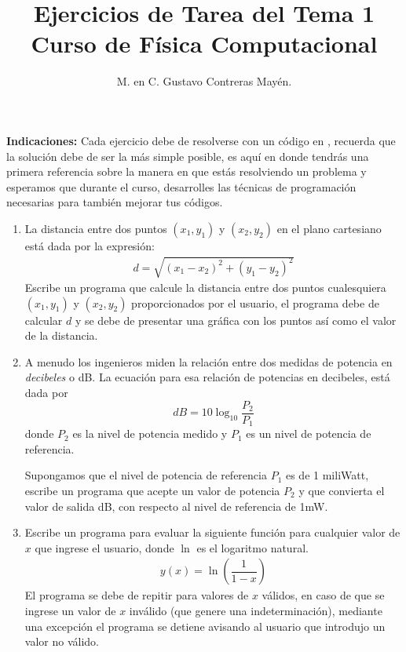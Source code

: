 
\author{M. en C. Gustavo Contreras Mayén.}
\title{Ejercicios de Tarea del Tema 1 \\ Curso de Física Computacional}
\date{ }

\maketitle
\fontsize{14}{14}\selectfont
\textbf{Indicaciones: } Cada ejercicio debe de resolverse con un código en \python, recuerda que la solución debe de ser la más simple posible, es aquí en donde tendrás una primera referencia sobre la manera en que estás resolviendo un problema y esperamos que durante el curso, desarrolles las técnicas de programación necesarias para también mejorar tus códigos.
\begin{enumerate}
\item La distancia entre dos puntos $(x_{1},y_{1})$ y $(x_{2},y_{2})$ en el plano cartesiano está dada por la expresión:
\begin{align*}
d = \sqrt{(x_{1} - x_{2})^{2} + (y_{1} - y_{2})^{2}}
\end{align*}
Escribe un programa que calcule la distancia entre dos puntos cualesquiera $(x_{1}, y_{1})$ y $(x_{2}, y_{2})$ proporcionados por el usuario, el programa debe de calcular $d$ y se debe de presentar una gráfica con los puntos así como el valor de la distancia.
\item A menudo los ingenieros miden la relación entre dos medidas de potencia en \textit{decibeles} o dB. La ecuación para esa relación de potencias en decibeles, está dada por
\[ dB = 10 \log_{10} \dfrac{P_{2}}{P_{1}} \]
donde $P_{2}$ es la nivel de potencia medido y $P_{1}$ es un nivel de potencia de referencia.
\par
Supongamos que el nivel de potencia de referencia $P_{1}$ es de 1 miliWatt, escribe un programa que acepte un valor de potencia $P_{2}$ y que convierta el valor de salida dB, con respecto al nivel de referencia de 1mW.
\item Escribe un programa para evaluar la siguiente función para cualquier valor de $x$ que ingrese el usuario, donde $\ln$ es el logaritmo natural.
\begin{align*}
y(x) = \ln \left( \dfrac{1}{1-x} \right)
\end{align*}
El programa se debe de repitir para valores de $x$ válidos, en caso de que se ingrese un valor de $x$ inválido (que genere una indeterminación), mediante una excepción el programa se detiene avisando al usuario que introdujo un valor no válido.

\end{enumerate}
